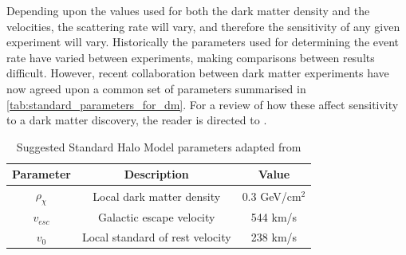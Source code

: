 \par
Depending upon the values used for both the dark matter density and the velocities, the scattering rate will vary, and therefore the sensitivity of any given experiment will vary.
Historically the parameters used for determining the event rate have varied between experiments, making comparisons between results difficult.
However, recent collaboration between dark matter experiments have now agreed upon a common set of parameters \cite{standard_halo_model_conventions_ref} summarised in \autoref{tab:standard_parameters_for_dm}.
For a review of how these affect sensitivity to a dark matter discovery, the reader is directed to \cite{dm_velocity_effects_on_limits_ref}.

\begin{table}[]
    \centering
    \begin{tabular}{c|c|c}
        Parameter                               & Description                       & Value         \\ \hline
        $\rho_{\chi}$                           & Local dark matter density         & 0.3 GeV/cm$^2$ \cite{shm_derivation_ref}           \\
        $v_{esc}$                             & Galactic escape velocity          & 544 km/s  \cite{dm_v_esc_ref}           \\
        $v_0$                             & Local standard of rest velocity   & 238 km/s   \cite{dm_v_0_ref}           
    \end{tabular}
    \caption{Suggested Standard Halo Model parameters adapted from \cite{standard_halo_model_conventions_ref}}
    \label{tab:standard_parameters_for_dm}
\end{table}

